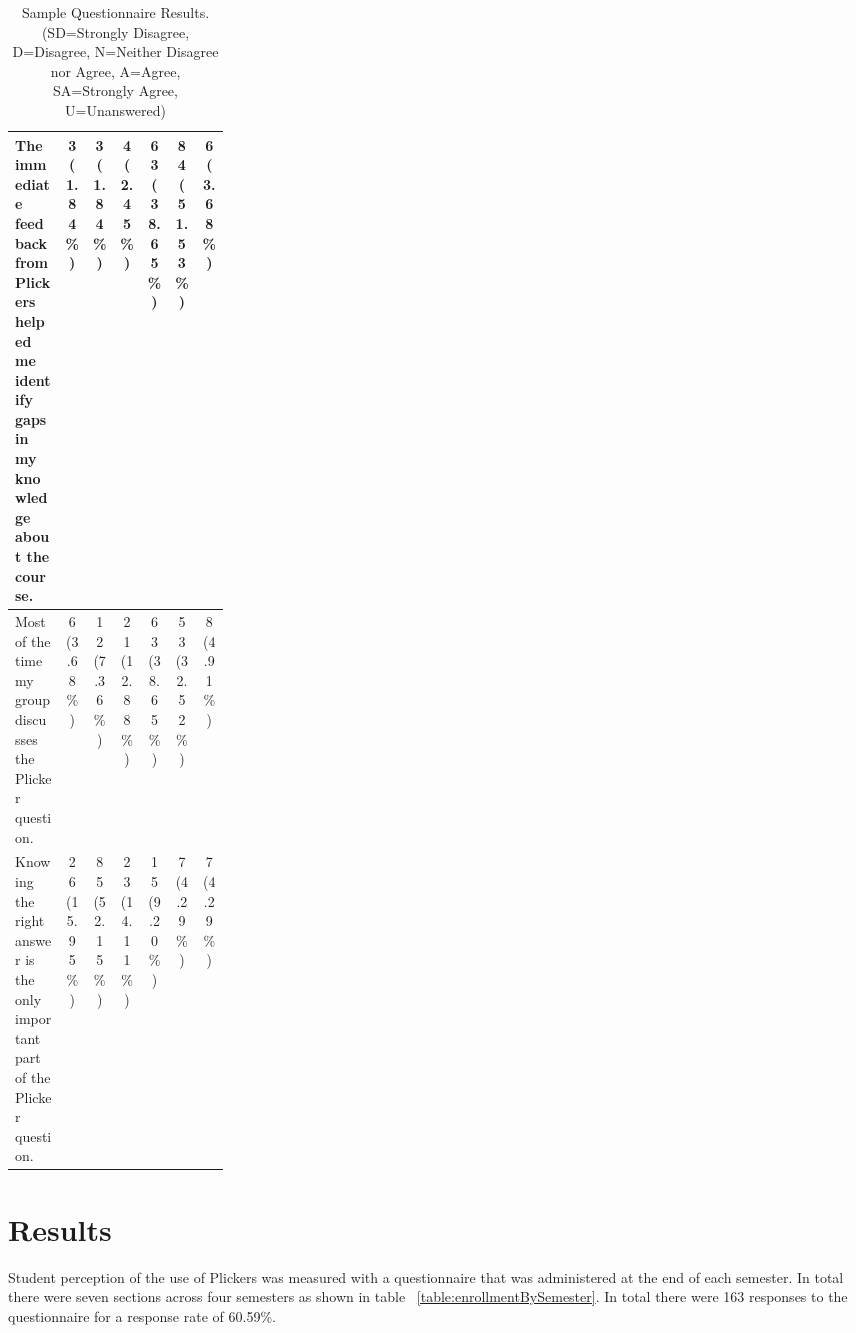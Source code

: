 \documentclass[12pt]{article}
\newcommand\sampleSize{163}
\begin{document}
\begin{table}[ht]
\begin{tabular}{p{0.25\linewidth} |c|c|c|c|c|c}
\rowcolor{LightGray}%
The immediate feedback from Plickers helped me identify gaps in my knowledge about the course. 
& 3 (1.84\%) 
& \specialcell{  3 \\(1.84\%)  }
& \specialcell{  4 \\(2.45\%)  }
& \specialcell{  63\\ (38.65\%) }
& \specialcell{  84 \\(51.53\%) }
& \specialcell{  6 \\(3.68\%)}\\\midrule 
Most of the time my group discusses the Plicker question.  
& 6 (3.68\%) 
& \specialcell{  12 \\(7.36\%) }
& \specialcell{  21\\ (12.88\%) }
& \specialcell{  63 \\(38.65\%) }
& \specialcell{  53 \\(32.52\%) }
& \specialcell{  8 \\(4.91\%)}\\\midrule 
\rowcolor{LightGray} %
Knowing the right answer is the only important part of the Plicker question. 
& 26 (15.95\%) 
& \specialcell{  85 \\(52.15\%) }
& \specialcell{  23\\ (14.11\%) }
& \specialcell{15 \\(9.20\%)}
& \specialcell{  7 \\(4.29\%)  }
& \specialcell{7 \\(4.29\%)}
\\\bottomrule
\end{tabular}
\label{table:questionnairesummary}
\caption{Sample Questionnaire Results.\\\hspace{\textwidth}(SD=Strongly Disagree, D=Disagree, N=Neither Disagree nor Agree, A=Agree, \\ SA=Strongly Agree, U=Unanswered)}
\end{table}
\restoregeometry

\section{Results}

Student perception of the use of Plickers was measured with a questionnaire that was administered at the end of each semester. In total there were seven sections across four semesters as shown in table ~\ref{table:enrollmentBySemester}. In total there were \sampleSize{}  responses to the questionnaire for a response rate of 60.59\%.
\end{document}
